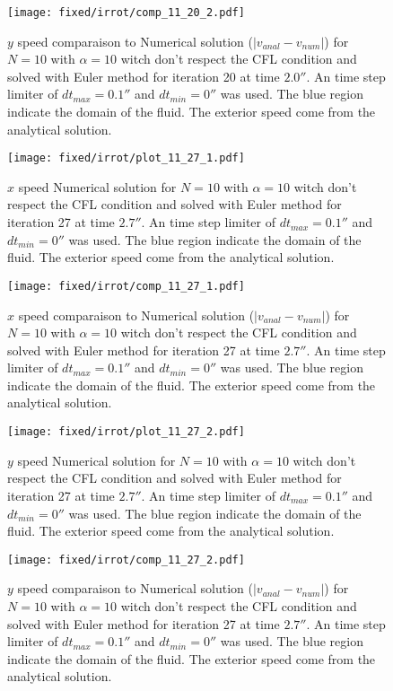 \begin{figure}
\texttt{[image: fixed/irrot/comp\_11\_20\_2.pdf]}
\caption{$y$ speed comparaison to Numerical solution ($|v_{anal}-v_{num}|$) for $N=10$ with $\alpha=10$ witch don't respect the CFL condition and solved with Euler method
for iteration 20 at time $\unit{2.0}{\second}$.
An time step limiter of $dt_{max}=\unit{0.1}{\second}$ and $dt_{min}=\unit{0}{\second}$ was used.
The blue region indicate the domain of the fluid. The exterior speed come from the analytical solution.
\label{fix:comp_11_20_2}
}
\end{figure}

\begin{figure}
\texttt{[image: fixed/irrot/plot\_11\_27\_1.pdf]}
\caption{$x$ speed Numerical solution for $N=10$ with $\alpha=10$ witch don't respect the CFL condition and solved with Euler method
for iteration 27 at time $\unit{2.7}{\second}$.
An time step limiter of $dt_{max}=\unit{0.1}{\second}$ and $dt_{min}=\unit{0}{\second}$ was used.
The blue region indicate the domain of the fluid. The exterior speed come from the analytical solution.
\label{fix:plot_11_27_1}
}
\end{figure}

\begin{figure}
\texttt{[image: fixed/irrot/comp\_11\_27\_1.pdf]}
\caption{$x$ speed comparaison to Numerical solution ($|v_{anal}-v_{num}|$) for $N=10$ with $\alpha=10$ witch don't respect the CFL condition and solved with Euler method
for iteration 27 at time $\unit{2.7}{\second}$.
An time step limiter of $dt_{max}=\unit{0.1}{\second}$ and $dt_{min}=\unit{0}{\second}$ was used.
The blue region indicate the domain of the fluid. The exterior speed come from the analytical solution.
\label{fix:comp_11_27_1}
}
\end{figure}

\begin{figure}
\texttt{[image: fixed/irrot/plot\_11\_27\_2.pdf]}
\caption{$y$ speed Numerical solution for $N=10$ with $\alpha=10$ witch don't respect the CFL condition and solved with Euler method
for iteration 27 at time $\unit{2.7}{\second}$.
An time step limiter of $dt_{max}=\unit{0.1}{\second}$ and $dt_{min}=\unit{0}{\second}$ was used.
The blue region indicate the domain of the fluid. The exterior speed come from the analytical solution.
\label{fix:plot_11_27_2}
}
\end{figure}

\begin{figure}
\texttt{[image: fixed/irrot/comp\_11\_27\_2.pdf]}
\caption{$y$ speed comparaison to Numerical solution ($|v_{anal}-v_{num}|$) for $N=10$ with $\alpha=10$ witch don't respect the CFL condition and solved with Euler method
for iteration 27 at time $\unit{2.7}{\second}$.
An time step limiter of $dt_{max}=\unit{0.1}{\second}$ and $dt_{min}=\unit{0}{\second}$ was used.
The blue region indicate the domain of the fluid. The exterior speed come from the analytical solution.
\label{fix:comp_11_27_2}
}
\end{figure}

